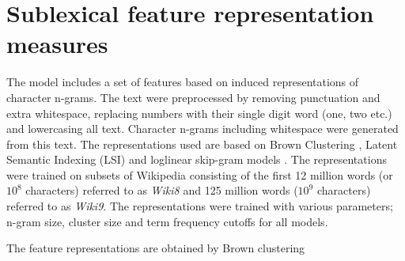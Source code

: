 \section{Sublexical feature representation measures}
\label{subrep-features}

The model includes a set of features based on induced representations of character n-grams. The text were preprocessed by removing punctuation and extra whitespace, replacing numbers with their single digit word (one, two etc.) and lowercasing all text. Character n-grams including whitespace were generated from this text. The representations used are based on Brown Clustering \cite{}, Latent Semantic Indexing (LSI) \cite{} and loglinear skip-gram models \cite{}. The representations were trained on subsets of Wikipedia consisting of the first 12 million words (or $10^8$ characters) referred to as {\it Wiki8} and 125 million words ($10^9$ characters) referred to as {\it Wiki9}. The representations were trained with various parameters;  n-gram size, cluster size and term frequency cutoffs for all models.

The feature representations are obtained by Brown clustering \cite{brown1992class}